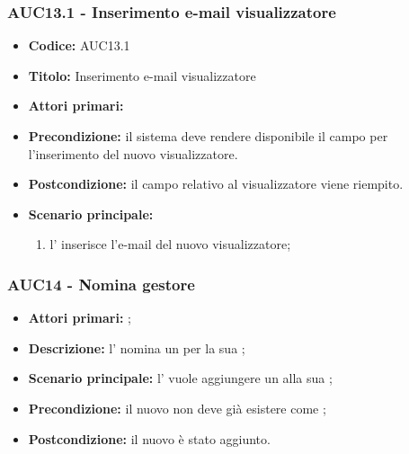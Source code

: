 \documentclass[casi-duso]{subfiles}
\begin{document}
\subsubsection{AUC13.1 - Inserimento e-mail visualizzatore}%
\label{subsub:AUC13.1}
\begin{itemize}
  \item \textbf{Codice:} AUC13.1
  \item \textbf{Titolo:} Inserimento e-mail visualizzatore
  \item \textbf{Attori primari:} 
  \item \textbf{Precondizione:} il sistema deve rendere disponibile il campo per l'inserimento del nuovo visualizzatore.
  \item \textbf{Postcondizione:} il campo relativo al visualizzatore viene riempito.
  \item \textbf{Scenario principale:} 
  \begin{enumerate}
    \item l'  inserisce l'e-mail del nuovo visualizzatore;
  \end{enumerate}
\end{itemize}

\subsubsection{AUC14 - Nomina gestore}%
\label{subsub:AUC14}
\begin{itemize}
  \item \textbf{Attori primari:} ;
  \item \textbf{Descrizione:} l'  nomina un  per la sua ;
  \item \textbf{Scenario principale:} l'  vuole aggiungere un  alla sua ;
  \item \textbf{Precondizione:} il nuovo  non deve già esistere come ;
  \item \textbf{Postcondizione:} il nuovo  è stato aggiunto.
\end{itemize}
\end{document}
